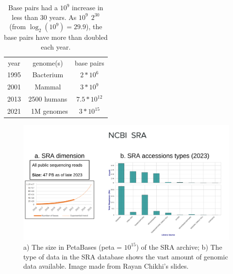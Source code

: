 \begin{table}[h!]
	\centering
	\begin{tabular}{c | c | c}
		year & genome(s) & base pairs \\
		1995 & Bacterium & $ 2*10^6$ \\
		2001 & Mammal & $ 3*10^9$ \\
		2013 & 2500 humans & $ 7.5*10^12$ \\
		2021 & ~1M genomes & $ 3*10^{15}$ \\
	\end{tabular}
	\caption[DNA data increase over the years.]{Base pairs had a $10^9$ increase in less than 30 years. As $10^9 ~~ 2^{30}$ (from $ \log_2(10^9) = 29.9$), the base pairs have more than doubled each year\cite{durbin_recomb}.}
	\label{tab:bp-increase}
\end{table}
\begin{figure}[h!]
	\centering
	\includegraphics[width=\linewidth]{figures/background/sra.png}
	\caption[The Sequence Read Archive.]{a) The size in PetaBases (peta = $10^{15}$) of the SRA archive; b) The type of data in the SRA database shows the vast amount of genomic data available. Image made from Rayan Chikhi's slides.\\}
	\label{fig:SRA}
\end{figure}

